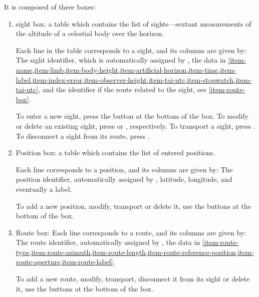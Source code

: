 \documentclass{ol-softwaremanual}
\begin{document}
It is composed of three boxes: 
\begin{enumerate}
  \item \label{item-sight-box} \Gls{sight} box: a table which contains the list of \glspl{sight}---\gls{sextant} measurements of the altitude of a celestial \gls{body} over the horizon. 
  
  Each line in the table corresponds to a \gls{sight}, and its columns are given by: The \gls{sight} identifier, which is automatically assigned by \thel,  the data in \cref{item-name,item-limb,item-body-height,item-artificial-horizon,item-time,item-label,item-index-error,item-observer-height,item-tai-utc,item-stopwatch,item-tai-utc}, and the identifier if the \gls{route} related to the \gls{sight}, see \cref{item-route-box}. 

  To enter a new \gls{sight}, press the  button at the bottom of the box. To modify or delete an existing \gls{sight}, press   or , respectively. To transport a \gls{sight}, press . 
   To disconnect a \gls{sight} from its \gls{route}, press  . 


 

  \item \label{item-position-box} Position box: a table which contains the list of entered \glspl{position}. 
  
  Each line corresponds to a \gls{position}, and its columns are given by: The \gls{position} identifier, automatically assigned by \thel,  latitude, longitude, and eventually a label. 

To add a new \gls{position}, modify, transport or delete it, use the buttons at the bottom of the box. 

  \item \label{item-route-box} Route box: Each line corresponds to a \gls{route}, and its columns are given by: The \gls{route} identifier, automatically assigned by \thel, the data in \cref{item-route-type,item-route-azimuth,item-route-length,item-route-reference-position,item-route-aperture,item-route-label}. 

  To add a new \gls{route}, modify, transport, disconnect it from its \gls{sight} or delete it, use the buttons at the bottom of the box. 

\end{enumerate}
\end{document}
